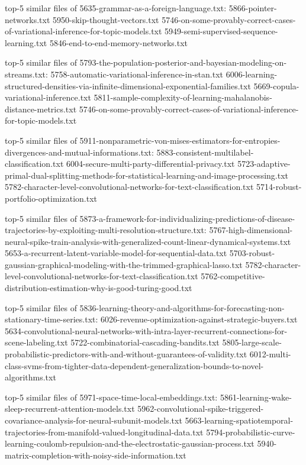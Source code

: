 \documentclass[11pt]{article}
\begin{document}
top-5 similar files of 5635-grammar-as-a-foreign-language.txt:
5866-pointer-networks.txt 5950-skip-thought-vectors.txt
5746-on-some-provably-correct-cases-of-variational-inference-for-topic-models.txt
5949-semi-supervised-sequence-learning.txt
5846-end-to-end-memory-networks.txt

top-5 similar files of
5793-the-population-posterior-and-bayesian-modeling-on-streams.txt:
5758-automatic-variational-inference-in-stan.txt
6006-learning-structured-densities-via-infinite-dimensional-exponential-families.txt
5669-copula-variational-inference.txt
5811-sample-complexity-of-learning-mahalanobis-distance-metrics.txt
5746-on-some-provably-correct-cases-of-variational-inference-for-topic-models.txt

top-5 similar files of
5911-nonparametric-von-mises-estimators-for-entropies-divergences-and-mutual-informations.txt:
5883-consistent-multilabel-classification.txt
6004-secure-multi-party-differential-privacy.txt
5723-adaptive-primal-dual-splitting-methods-for-statistical-learning-and-image-processing.txt
5782-character-level-convolutional-networks-for-text-classification.txt
5714-robust-portfolio-optimization.txt

top-5 similar files of
5873-a-framework-for-individualizing-predictions-of-disease-trajectories-by-exploiting-multi-resolution-structure.txt:
5767-high-dimensional-neural-spike-train-analysis-with-generalized-count-linear-dynamical-systems.txt
5653-a-recurrent-latent-variable-model-for-sequential-data.txt
5703-robust-gaussian-graphical-modeling-with-the-trimmed-graphical-lasso.txt
5782-character-level-convolutional-networks-for-text-classification.txt
5762-competitive-distribution-estimation-why-is-good-turing-good.txt

top-5 similar files of
5836-learning-theory-and-algorithms-for-forecasting-non-stationary-time-series.txt:
6026-revenue-optimization-against-strategic-buyers.txt
5634-convolutional-neural-networks-with-intra-layer-recurrent-connections-for-scene-labeling.txt
5722-combinatorial-cascading-bandits.txt
5805-large-scale-probabilistic-predictors-with-and-without-guarantees-of-validity.txt
6012-multi-class-svms-from-tighter-data-dependent-generalization-bounds-to-novel-algorithms.txt

top-5 similar files of 5971-space-time-local-embeddings.txt:
5861-learning-wake-sleep-recurrent-attention-models.txt
5962-convolutional-spike-triggered-covariance-analysis-for-neural-subunit-models.txt
5663-learning-spatiotemporal-trajectories-from-manifold-valued-longitudinal-data.txt
5794-probabilistic-curve-learning-coulomb-repulsion-and-the-electrostatic-gaussian-process.txt
5940-matrix-completion-with-noisy-side-information.txt
\end{document}

